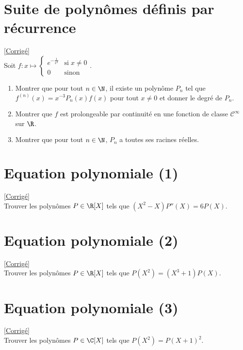 \documentclass{book}
\begin{document}
	\section{Suite de polynômes définis par récurrence}
	\textcolor{blue}{\hyperref[sec:suite-de-polynomes-definis-par-recurrence]{[Corrigé]}}\\
	\label{Suite de polynômes définis par récurrence}
	Soit $\displaystyle f:x\mapsto\begin{cases}
		e^{-\frac{1}{x^2}} &\text{si}\;x\ne0\\
		0 &\text{sinon}
	\end{cases}$.
	\begin{enumerate}
		\item Montrer que pour tout $n\in\N$, il existe un polynôme $P_n$ tel que $f^{(n)}(x)=x^{-3}P_n(x)f(x)$ pour tout $x\ne0$ et donner le degré de $P_n$.
		\item Montrer que $f$ est prolongeable par continuité en une fonction de classe $\mathcal C^\infty$ sur $\R$.
		\item Montrer que pour tout $n\in\N$, $P_n$ a toutes ses racines réelles.
	\end{enumerate}
	
	\section{Equation polynomiale (1)}
	\label{Equation polynomiale (1)}
	\textcolor{blue}{\hyperref[sec:équation-polynomiale-(1)]{[Corrigé]}}\\
	Trouver les polynômes $P\in \R[X]$ tels que $(X^2-X)P''(X)=6P(X)$.
	
	\section{Equation polynomiale (2)}
	\label{Equation polynomiale (2)}
	\textcolor{blue}{\hyperref[sec:équation-polynomiale-(2)]{[Corrigé]}}\\
	Trouver les polynômes $P\in \R[X]$ tels que $P(X^2)=(X^3+1)P(X)$.
	
	\section{Equation polynomiale (3)}
	\label{Equation polynomiale (3)}
	\textcolor{blue}{\hyperref[sec:équation-polynomiale-(3)]{[Corrigé]}}\\
	Trouver les polynômes $P\in \C[X]$ tels que $P(X^2)=P(X+1)^2$.
	
\end{document}
